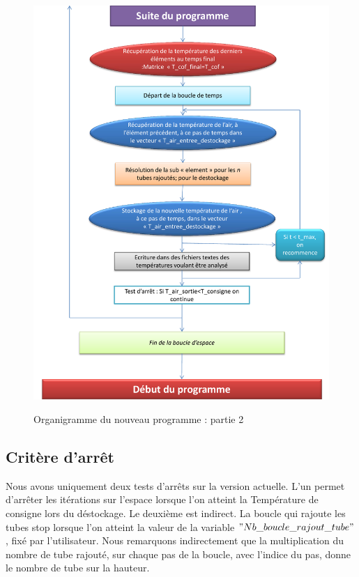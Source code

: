 \begin{figure}[!h]
\centering

\includegraphics[scale=0.8]{PHOTO/Organigramme_dernier_prog_2.pdf}
\label{dernier_prog_2}
\caption{Organigramme du nouveau programme : partie 2}
\end{figure}
\clearpage




\subsection{Critère d'arrêt}

Nous avons uniquement deux tests d'arrêts sur la version actuelle. L'un permet d'arrêter les itérations sur l'espace lorsque l'on atteint la Température de consigne lors du déstockage. Le deuxième est indirect. La boucle qui rajoute les tubes stop lorsque l'on atteint la valeur de la variable $"Nb\_boucle\_rajout\_tube"$, fixé par l'utilisateur. Nous remarquons indirectement que la multiplication du nombre de tube rajouté, sur chaque pas de la boucle, avec l'indice du pas, donne le nombre de tube sur la hauteur.

